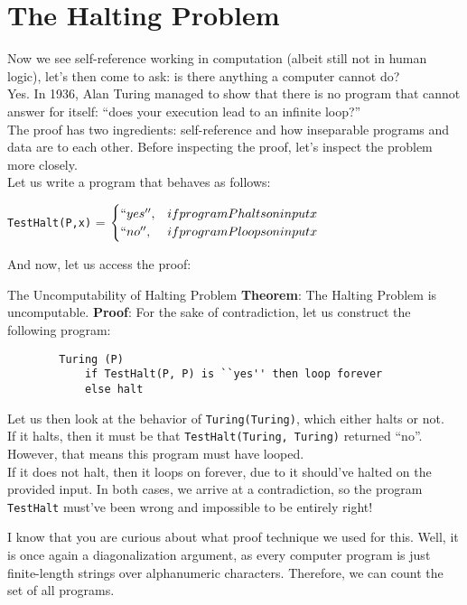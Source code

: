 \section{The Halting Problem}
Now we see self-reference working in computation (albeit still not in human logic), let's then come to ask: is there anything a computer cannot do? \\
Yes. In 1936, Alan Turing managed to show that there is no program that cannot answer for itself: ``does your execution lead to an infinite loop?'' \\
The proof has two ingredients: self-reference and how inseparable programs and data are to each other. Before inspecting the proof, let's inspect the problem more closely. \\
Let us write a program that behaves as follows:
\begin{center}
    \verb+TestHalt(P,x)+ = $
    \begin{cases}
        ``yes'', &if program P halts on input x \\
        ``no'', &if program P loops on input x
    \end{cases} $
\end{center}
And now, let us access the proof:
\begin{ln-theorem}{The Uncomputability of Halting Problem}{}
    \textbf{Theorem}: The Halting Problem is uncomputable.
    \tcblower
    \textbf{Proof}: For the sake of contradiction, let us construct the following program:
    \begin{verbatim}
        Turing (P)
            if TestHalt(P, P) is ``yes'' then loop forever
            else halt
    \end{verbatim}
    Let us then look at the behavior of \verb+Turing(Turing)+, which either halts or not. \\
    If it halts, then it must be that \verb+TestHalt(Turing, Turing)+ returned ``no''. However, that means this program must have looped. \\
    If it does not halt, then it loops on forever, due to it should've halted on the provided input.
    In both cases, we arrive at a contradiction, so the program \verb+TestHalt+ must've been wrong and impossible to be entirely right!
\end{ln-theorem}
I know that you are curious about what proof technique we used for this. Well, it is once again a diagonalization argument, as every computer program is just finite-length strings over alphanumeric characters. Therefore, we can count the set of all programs. \\
